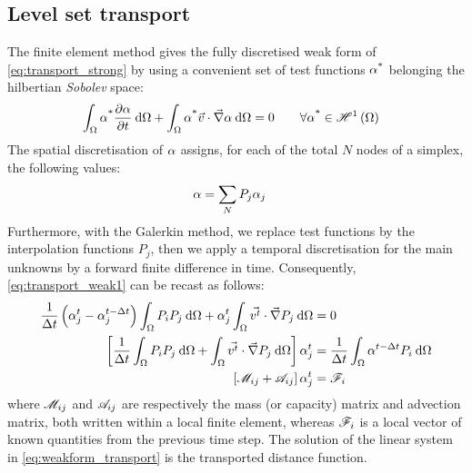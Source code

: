 \subsection{Level set transport}
The finite element method gives the fully discretised weak form of \cref{eq:transport_strong} 
by using a convenient set of test functions $\alpha^\text{*}$ belonging the hilbertian \emph{Sobolev} space:
\begin{align}
\label{eq:transport_weak1}
&  \int_{\Omega} \alpha^\text{*} \frac{\partial \alpha}{\partial t} \: \mathrm{d}\Omega + \int_{\Omega} \alpha^\text{*} \vec{v} \cdot \vec{\nabla} \alpha\: \mathrm{d}\Omega = 0
\qquad \forall \alpha^\text{*} \in \mathscr{H}^1 \left( \Omega \right)   
\end{align}
The spatial discretisation of $\alpha$ assigns, for each of the total $N$ nodes of a simplex, the following values:
\begin{align}
\label{eq:transport_weak2}
&  \alpha = \sum_N  P_j \alpha_j
\end{align}
Furthermore, with the Galerkin method, we replace test functions by the interpolation functions $P_j$, 
then we apply a temporal discretisation for the main unknowns by a forward finite difference in time.
Consequently, \cref{eq:transport_weak1} can be recast as follows:
\begin{subequations}
\begin{align}
\label{eq:transport_weak3}
  \frac{1}{\Delta t} \left( \alpha_j^t - \alpha_j^{t-\Delta t} \right)  \int_{\Omega} P_i P_j\: \mathrm{d}\Omega 
	+ \alpha_j^t   \int_{\Omega} \vec{v^t} \cdot \vec{\nabla} P_j \: \mathrm{d}\Omega &=  0 \\
\left[ \frac{1}{\Delta t} \int_{\Omega} P_i P_j \: \mathrm{d}\Omega + \int_{\Omega} \vec{v^t} \cdot \vec{\nabla} P_j \: \mathrm{d}\Omega \right] \alpha_j^t &= 
\frac{1}{\Delta t}  \int_{\Omega}  \alpha^{t-\Delta t} P_i \: \mathrm{d}\Omega \\
\label{eq:weakform_transport}
\left[ \mathscr{M}_{ij}+\mathscr{A}_{ij} \right] \alpha_j^t &= \mathscr{F}_{i}
\end{align}
\end{subequations}
where $\mathscr{M}_{ij}$ and $\mathscr{A}_{ij}$ are respectively the mass (or capacity) matrix and advection matrix, both written within a local 
finite element, whereas $\mathscr{F}_{i}$ is a local vector of known quantities from the previous time step. The solution of the linear
system in \cref{eq:weakform_transport} is the transported distance function.
%
%
